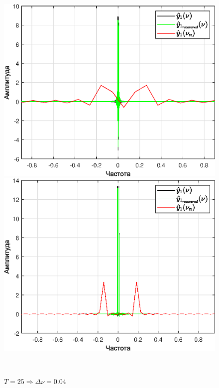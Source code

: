 \documentclass[a4paper]{article}
\begin{document}
\begin{figure}[H]
    \begin{minipage}{0.5\textwidth}
        \centering \includegraphics[width=\textwidth]{graphs2/T_10_dt_0.5_B_1_dv_0.1/func1_image.eps}
        \caption{$T = 10 \Rightarrow \Delta \nu = 0.1$}
    \end{minipage}\hfill
    \begin{minipage}{0.5\textwidth}
        \centering \includegraphics[width=\textwidth]{graphs2/T_25_dt_0.5_B_1_dv_0.04/func1_image.eps}
        \caption{$T = 25 \Rightarrow \Delta \nu = 0.04$}
    \end{minipage}\\[1em]
\end{figure}\noindent\
\end{document}
